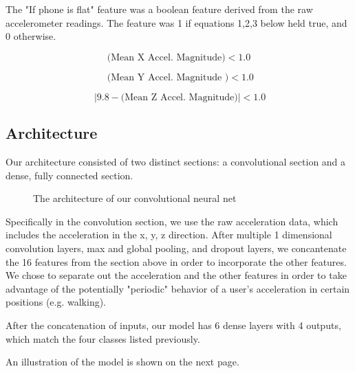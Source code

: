 The "If phone is flat" feature was a boolean feature derived from the raw accelerometer readings. 
The feature was 1 if equations 1,2,3 below held true, and 0 otherwise.

\begin{equation}\label{eq1}
    \text{(Mean X Accel. Magnitude)} < 1.0 
\end{equation}


\begin{equation}\label{eq2}
\text{ (Mean Y Accel. Magnitude )} < 1.0
\end{equation}

\begin{equation}\label{eq1}
\ |9.8 - \text{(Mean Z Accel. Magnitude)}| < 1.0
\end{equation}



\subsection{Architecture}
Our architecture consisted of two distinct sections: a convolutional section and a dense, fully connected section. 


\begin{figure*}[!h]
  \vspace{-0.2cm}
  \centering
   {}
  \caption{The architecture of our convolutional neural net}
  \label{fig1}
  \vspace{-0.1cm}
\end{figure*}

Specifically in the convolution section, we use the raw acceleration data, which includes the acceleration in the x, y, z direction. 
After multiple 1 dimensional convolution layers, max and global pooling, and dropout layers, we concantenate the 16 features from the section above in order to incorporate the other features. 
We chose to separate out the acceleration and the other features in order to take advantage of the potentially "periodic" behavior of a user's acceleration in certain positions (e.g. walking).

After the concatenation of inputs, our model has 6 dense layers with 4 outputs, which match the four classes listed previously. 

An illustration of the model is shown on the next page.

